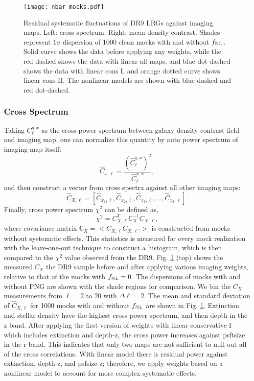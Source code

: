 \begin{figure*}
\centering
\texttt{[image: nbar\_mocks.pdf]}
\caption{Residual systematic fluctuations of DR9 LRGs against imaging maps. Left: cross spectrum. Right: mean density contrast. Shades represent $1\sigma$ dispersion of 1000 clean mocks with and without $f_{\rm NL}$. Solid curve shows the data before applying any weights, while the red dashed shows the data with linear all maps, and blue dot-dashed shows the data with linear cons I, and orange dotted curve shows linear cons II. The nonlinear models are shown with blue dashed and red dot-dashed.}\label{fig:clxmock}
\end{figure*}



\subsubsection{Cross Spectrum}
Taking $C^{g,x}_{\ell}$ as the cross power spectrum between galaxy density contrast field and imaging map, one can normalize this quantity by auto power spectrum of imaging map itself:
\begin{equation}
\hat{C}_{x, \ell} = \frac{(\hat{C}^{g,x}_{\ell})^{2}}{\hat{C}^{x,x}_{\ell}},
\end{equation}
and then construct a vector from cross spectra against all other imaging maps:
\begin{equation}
\hat{C}_{X, \ell} = [\hat{C}_{x_{1}, \ell}, \hat{C}_{x_{2}, \ell}, \hat{C}_{x_{3}, \ell}, ..., \hat{C}_{x_{9}, \ell}].
\end{equation}
Finally, cross power spectrum $\chi^{2}$ can be defined as,
\begin{equation}
\chi^{2} = C^{T}_{X, \ell} \mathbb{C}_{X}^{-1} C_{X, \ell},
\end{equation}
where covariance matrix $\mathbb{C}_{X} = < C_{X, \ell} C_{X, \ell'} >$ is constructed from mocks without systematic effects. This statistics is measured for every mock realization with the leave-one-out technique to construct a histogram, which is then compared to the $\chi^{2}$ value observed from the DR9.  Fig. \ref{fig:clxmock} (top) shows the measured $C_{X}$ the DR9 sample before and after applying various imaging weights, relative to that of the mocks with $f_{\rm NL}=0$. The dispersions of mocks with and without PNG are shown with the shade regions for comparison. We bin the $C_{X}$ measurements from $\ell=2$ to $20$ with $\Delta\ell=2$. The mean and standard deviation of $\hat{C}_{X, \ell}$ for 1000 mocks with and without $f_{\rm NL}$ are shown in Fig. \ref{fig:clxmock}.  Extinction and stellar density have the highest cross power spectrum, and then depth in the z band. After applying the first version of weights with linear conservative I which includes extinction and depth-z, the cross power increases against psftsize in the r band. This indicates that only two maps are not sufficient to null out all of the cross correlations. With linear model there is residual power against extinction, depth-z, and psfsize-z; therefore, we apply weights based on a nonlinear model to account for more complex systematic effects. 

